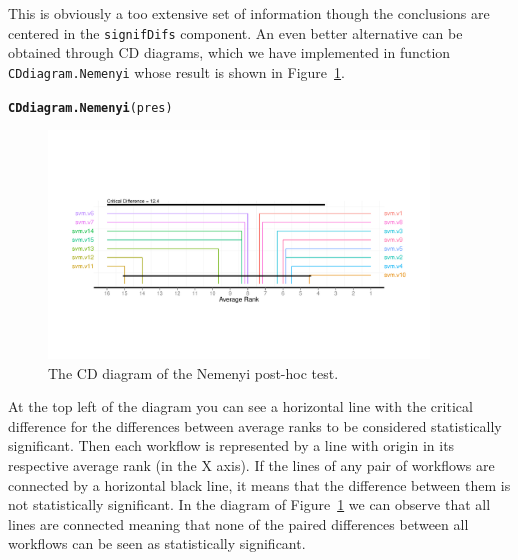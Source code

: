 \documentclass[10pt,a4paper]{article}\usepackage[]{graphicx}\usepackage[]{color}
\makeatletter
\newcommand{\hlstd}[1]{\textcolor[rgb]{0.345,0.345,0.345}{#1}}%
\newcommand{\hlkwd}[1]{\textcolor[rgb]{0.737,0.353,0.396}{\textbf{#1}}}%
\newenvironment{kframe}{%
 \def\at@end@of@kframe{}%
 \ifinner\ifhmode%
  \def\at@end@of@kframe{\end{minipage}}%
  \begin{minipage}{\columnwidth}%
 \fi\fi%
 \def\FrameCommand##1{\hskip\@totalleftmargin \hskip-\fboxsep
 \colorbox{shadecolor}{##1}\hskip-\fboxsep
     \hskip-\linewidth \hskip-\@totalleftmargin \hskip\columnwidth}%
 \MakeFramed {\advance\hsize-\width
   \@totalleftmargin\z@ \linewidth\hsize
   \@setminipage}}%
 {\par\unskip\endMakeFramed%
 \at@end@of@kframe}
\newenvironment{knitrout}{}{} %
\makeatother
\begin{document}
This is obviously a too extensive set of information though the conclusions are centered in the \texttt{signifDifs} component. An even better alternative can be obtained through CD diagrams, which we have implemented in function \texttt{CDdiagram.Nemenyi} whose result is shown in Figure~\ref{fig:cdn}.


\begin{knitrout}\scriptsize
{}\color{fgcolor}\begin{kframe}
\begin{alltt}
\hlkwd{CDdiagram.Nemenyi}\hlstd{(pres)}
\end{alltt}
\end{kframe}\begin{figure}[]


{\centering \includegraphics[width=0.9\textwidth]{figures/perfEst-cdn} 

}

\caption[The CD diagram of the Nemenyi post-hoc test]{The CD diagram of the Nemenyi post-hoc test.\label{fig:cdn}}
\end{figure}


\end{knitrout}

At the top left of the diagram you can see a horizontal line with the critical difference for the differences between average ranks to be considered statistically significant. Then each workflow is represented by a line with origin in its respective average rank (in the X axis). If the lines of any pair of workflows are connected by a horizontal black line, it means that the difference between them is not statistically significant. In the diagram of Figure~\ref{fig:cdn} we can observe that all lines are connected meaning that none of the paired differences between all workflows can be seen as statistically significant.
\end{document}
